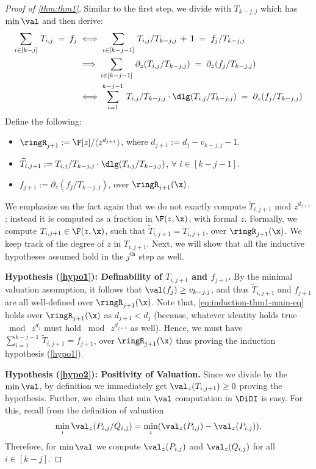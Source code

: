 \begin{proof}[Proof of \autoref{thm:thm1}]
Similar to the first step, we divide with $T_{k-j,j}$ which has $\min \val$ and then derive:
\begin{align}
    \sum_{i \in [k-j]}\,T_{i,j} \;=\; f_j  &\iff  \sum_{i \in [k-j-1]}\,T_{i,j}/T_{k-j,j} \,+\, 1 \;=\; f_j/T_{k-j,j} \nonumber\\  &\implies \sum_{i \in [k-j-1]}\,\partial_{z} (T_{i,j}/T_{k-j,j}) \;=\; \partial_{z}(f_j/T_{k-j,j})\nonumber \\ &\iff \sum_{i=1}^{k-j-1}\,T_{i,j}/T_{k-j,j} \cdot \dlg (T_{i,j}/T_{k-j,j}) \;=\; \partial_{z} (f_j/T_{k-j,j}) \label{eq:induction-thm1-main-eq}
\end{align}
Define the following:
\begin{itemize}
    \setlength\itemsep{1em}
    \item $\ringR_{j+1}:= \F[z]/ \langle z^{d_{j+1}} \rangle$, where $d_{j+1}:=d_j-v_{k-j,j}-1$. 
    \item $\widetilde{T}_{i,j+1} := T_{i,j}/T_{k-j,j} \cdot \dlg(T_{i,j}/T_{k-j,j})$, $\forall\;i \in [k-j-1]$.
    \item $f_{j+1}:=\partial_{z}(f_j/T_{k-j,j})$, over $\ringR_{j+1}(\x)$.
\end{itemize}

We emphasize on the fact again that we do not exactly compute $\widetilde{T}_{i,j+1}$ mod $z^{d_{j+1}}$; instead it is computed as a fraction in $\F(z,\x)$, with formal $z$. Formally, we compute $T_{i,j+1} \in \F(z,\x)$, such that $\widetilde{T}_{i,j+1} = T_{i,j+1}$, over $\ringR_{j+1}(\x)$. We keep track of the degree of $z$ in $T_{i,j+1}$. Next, we will show that all the inductive hypotheses assumed hold in the $j^{\text{th}}$ step as well. 

\smallskip

\noindent \textbf{Hypothesis (\ref{hypo1}): Definability of $T_{i,j+1}$ and $f_{j+1}$.} By the minimal valuation assumption, it follows that $\val(f_j) \ge v_{k-j,j}$, and thus $\widetilde{T}_{i,j+1}$ and $f_{j+1}$ are all well-defined over $\ringR_{j+1}(\x)$. Note that, \autoref{eq:induction-thm1-main-eq} holds over $\ringR_{j+1}(\x)$ as $d_{j+1} < d_j$ (because, whatever identity holds true $\bmod \ z^{d_j}$ must hold $\bmod \ z^{d_{j+1}}$ as well). Hence, we must have $\sum_{i=1}^{k-j-1}\, \widetilde{T}_{i,j+1} = f_{j+1}$, over $\ringR_{j+1}(\x)$ thus proving the induction hypothesis (\ref{hypo1}). 
 
%

\smallskip

\noindent \textbf{Hypothesis (\ref{hypo2}): Positivity of Valuation.} Since we divide by the $\min \val$, by definition we immediately get $\val_{z}(T_{i,j+1}) \ge 0$ proving the hypothesis. Further, we claim that min $\val$ computation in $\DiDI$ is easy. For this, recall from the definition of valuation \[\min_{i}\val_{z}(P_{i,j}/Q_{i,j})= \min_{i} (\val_{z}(P_{i,j}) - \val_{z}(P_{i,j}) ). \] Therefore, for $\min \val$ we compute $\val_{z}(P_{i,j})$ and $\val_{z}(Q_{i,j})$ for all $i \in [k-j]$.


\end{proof}
